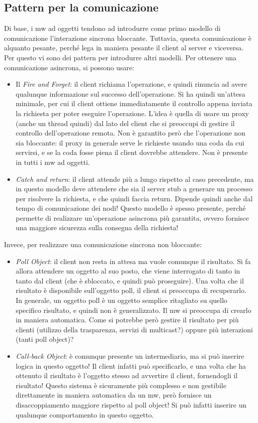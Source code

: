 \subsection{Pattern per la comunicazione}
Di base, i mw ad oggetti tendono ad introdurre come primo modello di comunicazione l'interazione sincrona bloccante.
Tuttavia, questa comunicazione è alquanto pesante, perché lega in maniera pesante il client al server e viceversa.
Per questo vi sono dei pattern per introdurre altri modelli.
Per ottenere una comunicazione asincrona, si possono usare:
\begin{itemize}
 \item Il \textit{Fire and Forget}: il client richiama l'operazione, e quindi rinuncia ad avere qualunque informazione
 sul successo dell'operazione. Si ha quindi un'attesa minimale, per cui il client ottiene immediatamente il controllo
 appena inviata la richiesta per poter eseguire l'operazione. L'idea è quella di usare un proxy (anche un thread quindi)
 dal lato del client che si preoccupi di gestire il controllo dell'operazione remota. Non è garantito però che
 l'operazione non sia bloccante: il proxy in generale serve le richieste usando una coda da cui servirsi, e se la coda
 fosse piena il client dovrebbe attendere. Non è presente in tutti i mw ad oggetti.
 \item \textit{Catch and return}: il client attende più a lungo rispetto al caso precedente, ma in questo modello deve
 attendere che sia il server stub a generare un processo per risolvere la richiesta, e che quindi faccia return. Dipende
 quindi anche dal tempo di comunicazione dei nodi! Questo modello è spesso presente, perché permette di realizzare
 un'operazione asincrona più garantita, ovvero fornisce una maggiore sicurezza sulla consegna della richiesta!
\end{itemize}
Invece, per realizzare una comunicazione sincrona non bloccante:
\begin{itemize}
 \item \textit{Poll Object}: il client non resta in attesa ma vuole comunque il risultato.
 Si fa allora attendere un oggetto al suo posto, che viene interrogato di tanto in tanto dal client (che è sbloccato, 
 e quindi può proseguire). Una volta che il risultato è disponibile sull'oggetto poll, il client si preoccupa di
 recuperarlo.
 In generale, un oggetto poll è un oggetto semplice ritagliato su quello specifico risultato, e quindi non è
 generalizzato. Il mw si preoccupa di crearlo in maniera automatica. Come si potrebbe però gestire il risultato per
 più clienti (utilizzo della trasparenza, servizi di multicast?) oppure più interazioni (tanti poll object)?
 \item \textit{Call-back Object}: è comunque presente un intermediario, ma si può inserire logica in questo oggetto!
 Il client infatti può specificarlo, e una volta che ha ottenuto il risultato è l'oggetto stesso ad avvertire il 
 client, fornendogli il risultato! Questo sistema è sicuramente più complesso e non gestibile direttamente in maniera
 automatica da un mw, però fornisce un disaccoppiamento maggiore rispetto al poll object! Si può infatti inserire
 un qualunque comportamento in questo oggetto.
\end{itemize}
